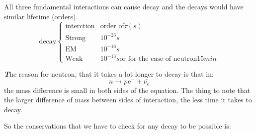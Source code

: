 \documentclass[10pt,a4paper]{article}
\newenvironment{callout}
	{\begin{calloutbox}\color{charcoal}\textbf\textit}
	{\end{calloutbox}}
\newcommand{\ch}[5]{{}^{#2}_{#3}\!\text{#1}^{#4}_{#5}}
\newcommand{\electron}{\ch{e}{}{}{-}{}}
\begin{document}
\begin{itemize}
\begin{itemize}
                    All three fundamental interactions can cause decay and the decays would have similar lifetime (orders).
                    \begin{equation}
                         \text{decay}\left\{\begin{matrix}
                              \text{interction} & \text{order of} \tau(s)\\
                              \text{Strong} & 10^{-23}s\\
                              \text{EM} & 10^{-16}s\\
                              \text{Weak} & 10^{-13 }s \text{or for the case of neutron} 15 min
                         \end{matrix}
                         \right.
                    \end{equation}
                    \begin{callout}
                         The reason for neutron, that it takes a lot longer to decay is that in:
                         \begin{equation}
                              n\rightarrow p \electron +\bar{\nu_e}
                         \end{equation}
                         the mass difference is small in both sides of the equation.
                         The thing to note that the larger difference of mass between sides of interaction, the less time it takes to decay.
                    \end{callout}
                    So the conservations that we have to check for any decay to be possible is:
                    \begin{itemize}

\end{itemize}
\end{itemize}
\end{itemize}
\end{document}
